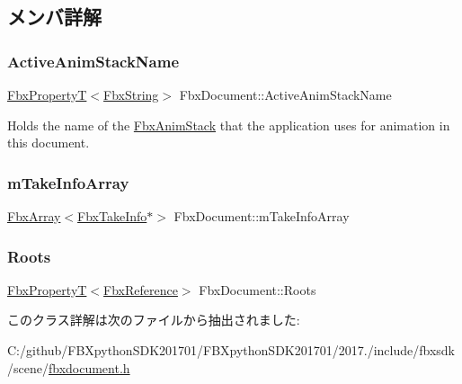 \subsection{メンバ詳解}
\mbox{\label{class_fbx_document_aec6d5eb0a7367383477588c087b09b87}} 
\subsubsection{\texorpdfstring{Active\+Anim\+Stack\+Name}{ActiveAnimStackName}}
{\footnotesize\ttfamily \hyperlink{class_fbx_property_t}{Fbx\+PropertyT}$<$\hyperlink{class_fbx_string}{Fbx\+String}$>$ Fbx\+Document\+::\+Active\+Anim\+Stack\+Name}

Holds the name of the \hyperlink{class_fbx_anim_stack}{Fbx\+Anim\+Stack} that the application uses for animation in this document. \mbox{\label{class_fbx_document_a810679765dee13dd45040367eb59b131}} 
\subsubsection{\texorpdfstring{m\+Take\+Info\+Array}{mTakeInfoArray}}
{\footnotesize\ttfamily \hyperlink{class_fbx_array}{Fbx\+Array}$<$\hyperlink{class_fbx_take_info}{Fbx\+Take\+Info}$\ast$$>$ Fbx\+Document\+::m\+Take\+Info\+Array\hspace{0.3cm}{\ttfamily [protected]}}

\mbox{\label{class_fbx_document_a268f701bbd245e43e661bc9a69f87646}} 
\subsubsection{\texorpdfstring{Roots}{Roots}}
{\footnotesize\ttfamily \hyperlink{class_fbx_property_t}{Fbx\+PropertyT}$<$\hyperlink{fbxtypes_8h_a44df6a2eec915cf27cd481e5c5e48a24}{Fbx\+Reference}$>$ Fbx\+Document\+::\+Roots}



このクラス詳解は次のファイルから抽出されました\+:\begin{DoxyCompactItemize}
\item 
C\+:/github/\+F\+B\+Xpython\+S\+D\+K201701/\+F\+B\+Xpython\+S\+D\+K201701/2017./include/fbxsdk/scene/\hyperlink{fbxdocument_8h}{fbxdocument.\+h}\end{DoxyCompactItemize}
